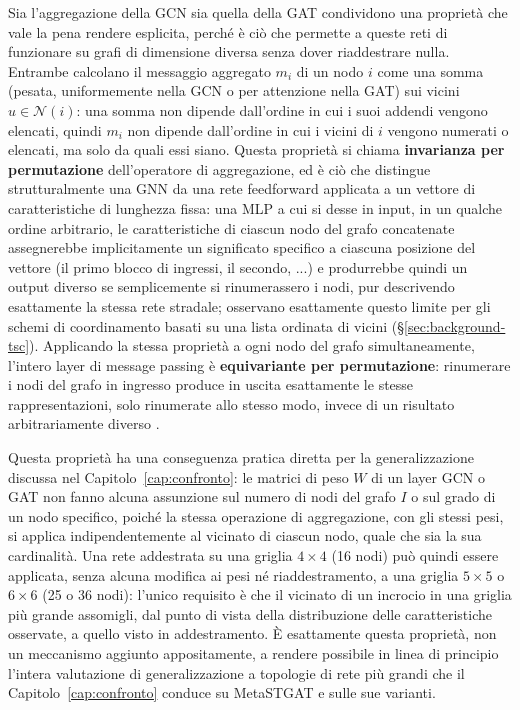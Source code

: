Sia l'aggregazione della GCN sia quella della GAT condividono una
proprietà che vale la pena rendere esplicita, perché è ciò che permette a
queste reti di funzionare su grafi di dimensione diversa senza dover
riaddestrare nulla. Entrambe calcolano il messaggio aggregato $m_i$ di un
nodo $i$ come una somma (pesata, uniformemente nella GCN o per attenzione
nella GAT) sui vicini $u \in \mathcal{N}(i)$: una somma non dipende
dall'ordine in cui i suoi addendi vengono elencati, quindi $m_i$ non
dipende dall'ordine in cui i vicini di $i$ vengono numerati o elencati, ma
solo da quali essi siano. Questa proprietà si chiama \textbf{invarianza per
permutazione} dell'operatore di aggregazione, ed è ciò che distingue
strutturalmente una GNN da una rete feedforward applicata a un vettore di
caratteristiche di lunghezza fissa: una MLP a cui si desse in input, in un
qualche ordine arbitrario, le caratteristiche di ciascun nodo del grafo
concatenate assegnerebbe implicitamente un significato specifico a ciascuna
posizione del vettore (il primo blocco di ingressi, il secondo, ...) e
produrrebbe quindi un output diverso se semplicemente si rinumerassero i
nodi, pur descrivendo esattamente la stessa rete stradale;
\citet{wei2019colight} osservano esattamente questo limite per gli schemi
di coordinamento basati su una lista ordinata di vicini
(§\ref{sec:background-tsc}). Applicando la stessa proprietà a ogni nodo del
grafo simultaneamente, l'intero layer di message passing è
\textbf{equivariante per permutazione}: rinumerare i nodi del grafo in
ingresso produce in uscita esattamente le stesse rappresentazioni,
solo rinumerate allo stesso modo, invece di un risultato arbitrariamente
diverso \citep{bronstein2021geometric}.

Questa proprietà ha una conseguenza pratica diretta per la generalizzazione
discussa nel Capitolo~\ref{cap:confronto}: le matrici di peso $W$ di un
layer GCN o GAT non fanno alcuna assunzione sul numero di nodi del grafo
$I$ o sul grado di un nodo specifico, poiché la stessa operazione di
aggregazione, con gli stessi pesi, si applica indipendentemente al vicinato
di ciascun nodo, quale che sia la sua cardinalità. Una rete addestrata
su una griglia $4\times4$ (16 nodi) può quindi essere applicata, senza
alcuna modifica ai pesi né riaddestramento, a una griglia $5\times5$ o
$6\times6$ (25 o 36 nodi): l'unico requisito è che il vicinato di un
incrocio in una griglia più grande assomigli, dal punto di vista della
distribuzione delle caratteristiche osservate, a quello visto in
addestramento. È esattamente questa proprietà, non un meccanismo aggiunto
appositamente, a rendere possibile in linea di principio l'intera
valutazione di generalizzazione a topologie di rete più grandi che il
Capitolo~\ref{cap:confronto} conduce su MetaSTGAT e sulle sue varianti.

